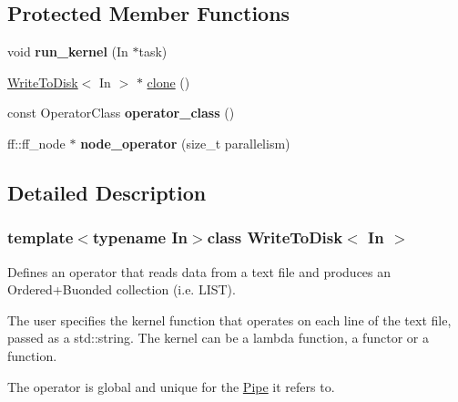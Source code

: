 \subsection*{\-Protected \-Member \-Functions}
\begin{DoxyCompactItemize}
\item 
\hypertarget{class_write_to_disk_a9b5fc69a20e3a5d95d8522711f263104}{void {\bfseries run\-\_\-kernel} (\-In $\ast$task)}\label{class_write_to_disk_a9b5fc69a20e3a5d95d8522711f263104}

\item 
\hyperlink{class_write_to_disk}{\-Write\-To\-Disk}$<$ \-In $>$ $\ast$ \hyperlink{class_write_to_disk_a0f070d389c1624810e727f648e0fc8fd}{clone} ()
\item 
\hypertarget{class_write_to_disk_a5a4d3a2a0018e52510389b7d630ed794}{const \-Operator\-Class {\bfseries operator\-\_\-class} ()}\label{class_write_to_disk_a5a4d3a2a0018e52510389b7d630ed794}

\item 
\hypertarget{class_write_to_disk_aa4d82f9b9b6618881c9a420f043accf8}{ff\-::ff\-\_\-node $\ast$ {\bfseries node\-\_\-operator} (size\-\_\-t parallelism)}\label{class_write_to_disk_aa4d82f9b9b6618881c9a420f043accf8}

\end{DoxyCompactItemize}


\subsection{\-Detailed \-Description}
\subsubsection*{template$<$typename \-In$>$class Write\-To\-Disk$<$ In $>$}

\-Defines an operator that reads data from a text file and produces an \-Ordered+\-Buonded collection (i.\-e. \-L\-I\-S\-T).

\-The user specifies the kernel function that operates on each line of the text file, passed as a std\-::string. \-The kernel can be a lambda function, a functor or a function.

\-The operator is global and unique for the \hyperlink{class_pipe}{\-Pipe} it refers to. 

